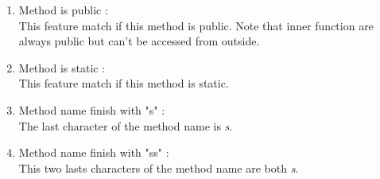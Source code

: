 \documentclass[12pt]{article}
\newcommand{\code}[1]{{\fontfamily{phv}\selectfont \small{\begin{tabbing} #1 \end{tabbing}}}}
\begin{document}
\begin{enumerate}
\item Method is public :\\
	This feature match if this method is public. Note that inner function are always public but can't be accessed from outside.
\item Method is static :\\
	This feature match if this method is static. 
\item Method name finish with "s" :\label{fs}\\
	The last character of the method name is \textit{s}.
\item Method name finish with "ss" : \label{fss} \\
	This two lasts characters of the method name are both \textit{s}.

\end{enumerate}
\end{document}
